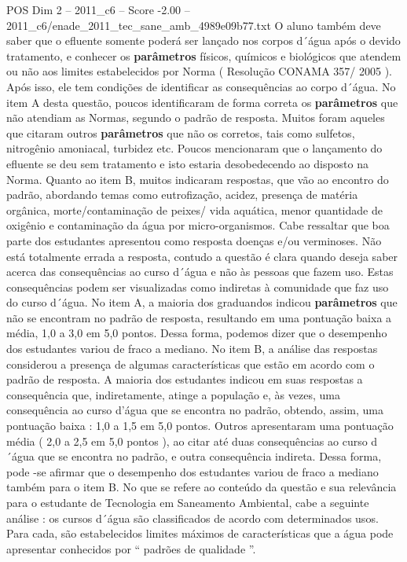 \begin{textsample}{POS Dim 2 – 2011\_c6 – Score -2.00 – 2011\_c6/enade\_2011\_tec\_sane\_amb\_4989e09b77.txt}
O aluno também deve saber que o efluente somente poderá ser lançado nos corpos d´água após o devido tratamento, e conhecer os \textbf{parâmetros} físicos, químicos e biológicos que atendem ou não aos limites estabelecidos por Norma ( Resolução CONAMA 357/ 2005 ).
Após isso, ele tem condições de identificar as consequências ao corpo d´água.
No item A desta questão, poucos identificaram de forma correta os \textbf{parâmetros} que não atendiam as Normas, segundo o padrão de resposta.
Muitos foram aqueles que citaram outros \textbf{parâmetros} que não os corretos, tais como sulfetos, nitrogênio amoniacal, turbidez etc.
Poucos mencionaram que o lançamento do efluente se deu sem tratamento e isto estaria desobedecendo ao disposto na Norma.
Quanto ao item B, muitos indicaram respostas, que vão ao encontro do padrão, abordando temas como eutrofização, acidez, presença de matéria orgânica, morte/contaminação de peixes/ vida aquática, menor quantidade de oxigênio e contaminação da água por micro-organismos.
Cabe ressaltar que boa parte dos estudantes apresentou como resposta doenças e/ou verminoses.
Não está totalmente errada a resposta, contudo a questão é clara quando deseja saber acerca das consequências ao curso d´água e não às pessoas que fazem uso.
Estas consequências podem ser visualizadas como indiretas à comunidade que faz uso do curso d´água.
No item A, a maioria dos graduandos indicou \textbf{parâmetros} que não se encontram no padrão de resposta, resultando em uma pontuação baixa a média, 1,0 a 3,0 em 5,0 pontos.
Dessa forma, podemos dizer que o desempenho dos estudantes variou de fraco a mediano.
No item B, a análise das respostas considerou a presença de algumas características que estão em acordo com o padrão de resposta.
A maioria dos estudantes indicou em suas respostas a consequência que, indiretamente, atinge a população e, às vezes, uma consequência ao curso d’água que se encontra no padrão, obtendo, assim, uma pontuação baixa : 1,0 a 1,5 em 5,0 pontos.
Outros apresentaram uma pontuação média ( 2,0 a 2,5 em 5,0 pontos ), ao citar até duas consequências ao curso d´água que se encontra no padrão, e outra consequência indireta.
Dessa forma, pode -se afirmar que o desempenho dos estudantes variou de fraco a mediano também para o item B.
No que se refere ao conteúdo da questão e sua relevância para o estudante de Tecnologia em Saneamento Ambiental, cabe a seguinte análise : os cursos d´água são classificados de acordo com determinados usos.
Para cada, são estabelecidos limites máximos de características que a água pode apresentar conhecidos por “ padrões de qualidade ”.

\end{textsample}
